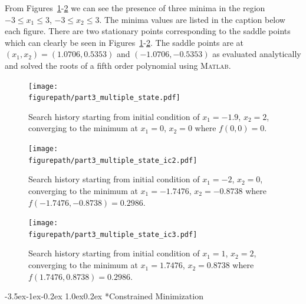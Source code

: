 \documentclass[11pt,letterpaper,onecolumn,notitlepage]{article}
\makeatletter
\newcommand{\figurepath}{../fig/hw1}
\renewcommand\section{\@startsection{section}{1}{\z@}%
{-3.5ex\@plus-1ex\@minus-0.2ex}%
{1.0ex\@plus0.2ex}%
{\fontsize{12pt}{12pt}\selectfont\bfseries\sffamily}}
\makeatother
\begin{document}
  From Figures~\ref{fig:part3_multiple_state}-\ref{fig:part3_multiple_state_ic3} we can see the presence of three minima in the region $-3\leq x_{1}\leq3$, $-3\leq x_{2}\leq3$.
  The minima values are listed in the caption below each figure.
  There are two stationary points corresponding to the saddle points which can clearly be seen in Figures~\ref{fig:part3_multiple_state}-\ref{fig:part3_multiple_state_ic3}.
  The saddle points are at $(x_{1},x_{2})=(1.0706,0.5353)$ and $(-1.0706,-0.5353)$ as evaluated analytically and solved the roots of a fifth order polynomial using \textsc{Matlab}.

  \begin{figure}[H]
    \begin{center}
      \texttt{[image: \\figurepath/part3\_multiple\_state.pdf]}
      \caption{Search history starting from initial condition of $x_{1}=-1.9$, $x_{2}=2$, converging to the minimum at $x_{1}=0$, $x_{2}=0$ where $f(0,0)=0$.\label{fig:part3_multiple_state}}
    \end{center}
  \end{figure}

  \vspace{-0.5in}

  \begin{figure}[H]
    \centering
    \begin{minipage}{.48\textwidth}
      \centering
      \texttt{[image: \\figurepath/part3\_multiple\_state\_ic2.pdf]}
      \caption{Search history starting from initial condition of $x_{1}=-2$, $x_{2}=0$, converging to the minimum at $x_{1}=-1.7476$, $x_{2}=-0.8738$ where $f(-1.7476,-0.8738)=0.2986$.\label{fig:part3_multiple_state_ic2}}
    \end{minipage}
    \hfill
    \begin{minipage}{.48\textwidth}
      \centering
      \texttt{[image: \\figurepath/part3\_multiple\_state\_ic3.pdf]}
      \caption{Search history starting from initial condition of $x_{1}=1$, $x_{2}=2$, converging to the minimum at $x_{1}=1.7476$, $x_{2}=0.8738$ where $f(1.7476,0.8738)=0.2986$.\label{fig:part3_multiple_state_ic3}}
    \end{minipage}
  \end{figure}

  \clearpage
  \section*{Constrained Minimization}
\end{document}
